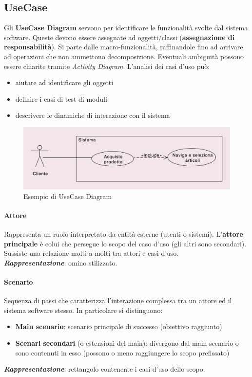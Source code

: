 \subsection{UseCase}

Gli \textbf{UseCase Diagram} servono per identificare le funzionalità svolte dal sistema software. Queste devono essere assegnate ad oggetti/classi (\textbf{assegnazione di responsabilità}). Si parte dalle macro-funzionalità, raffinandole fino ad arrivare ad operazioni che non ammettono decomposizione. Eventuali ambiguità possono essere chiarite tramite \textit{Activity Diagram}. L'analisi dei casi d'uso può:
\begin{itemize}
    \item aiutare ad identificare gli oggetti
    \item definire i casi di test di moduli
    \item descrivere le dinamiche di interazione con il sistema
\end{itemize}

\begin{figure}[h!]
    \centering
    \includegraphics[width=0.75\linewidth]{assets/UML/use-case/use-case1.png}
    \caption{Esempio di UseCase Diagram}
    \label{fig:use-case1}
\end{figure}

\paragraph{Attore} Rappresenta un ruolo interpretato da entità esterne (utenti o sistemi). L'\textbf{attore principale} è colui che persegue lo scopo del caso d'uso (gli altri sono secondari). Sussiste una relazione molti-a-molti tra attori e casi d'uso.\\ \textbf{\textit{Rappresentazione}}: omino stilizzato.

\paragraph{Scenario} Sequenza di passi che caratterizza l'interazione complessa tra un attore ed il sistema software stesso. In particolare si distinguono:
\begin{itemize}
    \item \textbf{Main scenario}: scenario principale di successo (obiettivo raggiunto)
    \item \textbf{Scenari secondari} (o estensioni del main): divergono dal main scenario o sono contenuti in esso (possono o meno raggiungere lo scopo prefissato)
\end{itemize}
\textbf{\textit{Rappresentazione}}: rettangolo contenente i casi d'uso dello scopo.

